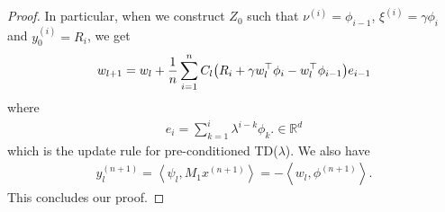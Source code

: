 \documentclass{article}
\newcommand{\R}{\mathbb{R}}
\newcommand{\indot}[2]{{\left<#1, #2\right>}}
\begin{document}
\begin{proof}
        In particular, when we construct $Z_0$ such that $\nu^{(i)} = \phi_{i-1}$, $\xi^{(i)} = \gamma \phi_i$ and $y_0^{(i)} = R_i$, 
        we get
        \begin{align}
            w_{l+1} = w_l + \frac{1}{n}\sum_{i=1}^n C_l \qty(R_i + \gamma w_l^\top \phi_i - w_l^\top \phi_{i-1}) e_{i-1}
        \end{align}
        where
        \begin{align}
            e_i = \sum_{k=1}^i \lambda^{i-k} \phi_k. \in \R^d
        \end{align}
        which is the update rule for pre-conditioned TD($\lambda$).
        We also have
        \begin{align}
            y_l^{(n+1)}
            = \indot{\psi_l}{M_1 x^{(n+1)}} 
            = -\indot{w_l}{\phi^{(n+1)}}.
        \end{align}
        This concludes our proof.
\end{proof}
\end{document}

